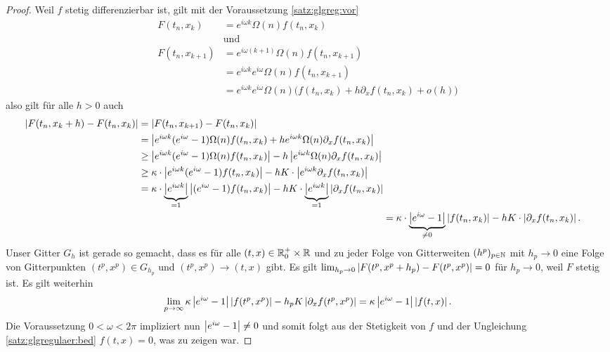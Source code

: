 \begin{proof}
Weil $f$ stetig differenzierbar ist, gilt mit der Voraussetzung \eqref{satz:glgreg:vor}
\begin{align*}
F(t_n, x_k) &= e^{i \omega k} \Omega(n) f(t_n, x_k)\\
&\text{und}\\
F(t_n, x_{k+1}) &= e^{i \omega (k + 1)} \Omega(n) f(t_n, x_{k+1})\\
&= e^{i \omega k} e^{i \omega} \Omega(n) f(t_n, x_{k+1})\\
&= e^{i \omega k} e^{i \omega} \Omega(n) \bigl( f(t_n, x_k) + h \partial_x f(t_n, x_k) + o(h) \bigr)
\end{align*}
also gilt für alle $h > 0$ auch
\begin{align}
\begin{split}\nonumber
\left| F(t_n, x_k + h) - F(t_n, x_k) \right| &= \left| F(t_n, x_{k+1}) - F(t_n, x_k) \right|\\
&= \left| e^{i \omega k} (e^{i \omega} - 1) \Omega(n) f(t_n, x_k) + h e^{i \omega k} \Omega(n) \partial_x f(t_n, x_k) \right|\\
&\geq \left|  e^{i \omega k} (e^{i \omega} - 1) \Omega(n) f(t_n, x_k)  \right|  - h  \left|  e^{i \omega k} \Omega(n) \partial_x f(t_n, x_k)  \right|\\
&\geq \kappa \cdot \left|  e^{i \omega k} (e^{i \omega} - 1) f(t_n, x_k)  \right|  - h  K \cdot \left|  e^{i \omega k} \partial_x f(t_n, x_k)  \right|\\
&= \kappa \cdot \underbrace{\left|  e^{i \omega k}  \right|}_{= 1} \left|  (e^{i \omega} - 1) f(t_n, x_k)  \right| - hK \cdot  \underbrace{\left|  e^{i \omega k}  \right|}_{= 1} \left|  \partial_x f(t_n, x_k)  \right|
\end{split}\\ \label{satz:glgregulaer:bed}
&= \kappa \cdot \underbrace{\left| e^{i \omega} - 1 \right|}_{\neq 0} \left| f(t_n, x_k) \right| - hK \cdot \left| \partial_x f(t_n, x_k) \right|.
\end{align}
Unser Gitter $G_h$ ist gerade so gemacht, dass es für alle $(t,x) \in \mathbb R^+_0 \times \mathbb R$ und zu jeder Folge von Gitterweiten $(h^p)_{p \in \mathbb N}$ mit $h_p \to 0$ eine Folge von Gitterpunkten $(t^p, x^p) \in G_{h_p}$ und $(t^p, x^p) \to (t,x)$ gibt.
Es gilt $\lim_{h_p \to 0} \left| F(t^p, x^p + h_p) - F(t^p, x^p) \right| = 0$ für $h_p \to 0$, weil $F$ stetig ist.
Es gilt weiterhin
\[ \lim_{p \to \infty} \kappa \left| e^{i \omega} - 1 \right| \left| f(t^p, x^p) \right| - h_pK \left| \partial_x f(t^p, x^p) \right| = \kappa \left| e^{i \omega} - 1 \right| \left| f(t, x) \right|. \]
Die Voraussetzung $0 < \omega < 2 \pi$ impliziert nun $\left| e^{i \omega} - 1 \right| \neq 0$ und somit folgt aus der Stetigkeit von $f$ und der Ungleichung \eqref{satz:glgregulaer:bed} $f(t,x) = 0$, was zu zeigen war.
\end{proof}
